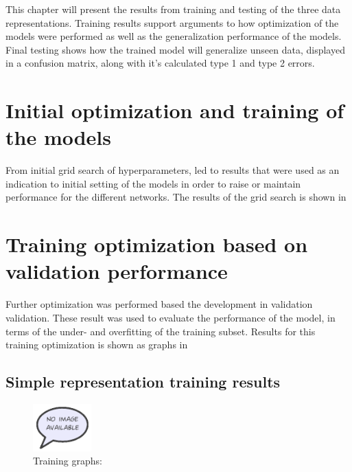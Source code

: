 \documentclass[12pt,a4paper]{article}
\author{Mads Kristensen}
\begin{document}
This chapter will present the results from training and testing of the three data representations. Training results support arguments to how optimization of the models were performed as well as the generalization performance of the models. Final testing shows how the trained model will generalize unseen data, displayed in a confusion matrix, along with it's calculated type 1 and type 2 errors. 

\section{Initial optimization and training of the models}
From initial grid search of hyperparameters, led to results that were used as an indication to initial setting of the models in order to raise or maintain performance for the different networks. The results of the grid search is shown in %


\section{Training optimization based on validation performance}
Further optimization was performed based the development in validation validation. These result was used to evaluate the performance of the model, in terms of the under- and overfitting of the training subset. Results for this training optimization is shown as graphs in %

\subsection{Simple representation training results}
\begin{figure} [H]
\centering
\includegraphics[width=0.2\textwidth]{figures/missimage}
\caption{Training graphs: }
\label{fig:simpleGraph}  
\end{figure}
\end{document}
